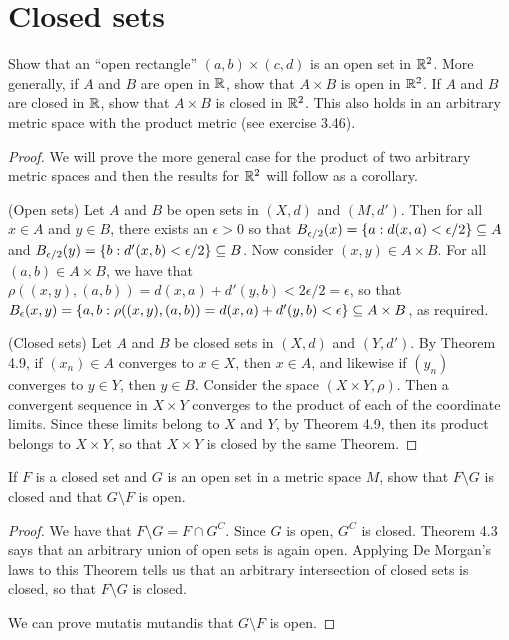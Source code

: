 \section{Closed sets}


\begin{exercise}{1}
Show that an ``open rectangle'' $(a,b)\times (c,d)$ is an open set in $\mathbb{R}^2$. More generally, if $A$ and $B$ are open in $\mathbb{R}$, show that $A\times B$ is open in $\mathbb{R}^2$. 
If $A$ and $B$ are closed in $\mathbb{R}$, show that $A\times B$ is closed in $\mathbb{R}^2$. 
This also holds in an arbitrary metric space with the product metric (see exercise 3.46).
\end{exercise}
\begin{proof}
We will prove the more general case for the product of two arbitrary metric spaces and then the results for $\mathbb{R}^2$ will follow as a corollary.

(Open sets) Let $A$ and $B$ be open sets in $(X,d)$ and $(M,d')$. 
Then for all $x\in A$ and $y\in B$, there exists an $\epsilon>0$ so that $B_{\epsilon/2}(x)=\{a:d(x,a)<\epsilon/2\}\subseteq A$ and $B_{\epsilon/2}(y)=\{b:d'(x,b)<\epsilon/2\}\subseteq B$. 
Now consider $(x,y)\in A\times B$. 
For all $(a,b)\in A\times B$, we have that $\rho((x,y),(a,b))=d(x,a)+d'(y,b)<2\epsilon/2=\epsilon$, so that $B_\epsilon(x,y)=\{a,b:\rho((x,y),(a,b))=d(x,a)+d'(y,b)<\epsilon\}\subseteq A\times B$, as required.

(Closed sets) Let $A$ and $B$ be closed sets in $(X,d)$ and $(Y,d')$. 
By Theorem 4.9, if $(x_n)\in A$ converges to $x\in X$, then $x\in A$, and likewise if $(y_n)$ converges to $y\in Y$, then $y\in B$. 
Consider the space $(X\times Y, \rho)$. 
Then a convergent sequence in $X\times Y$ converges to the product of each of the coordinate limits. 
Since these limits belong to $X$ and $Y$, by Theorem 4.9, then its product belongs to $X\times Y$, so that $X\times Y$ is closed by the same Theorem.
\end{proof} 

\begin{exercise}{2}
If $F$ is a closed set and $G$ is an open set in a metric space $M$, show that $F\setminus G$ is closed and that $G\setminus F$ is open.
\end{exercise}
\begin{proof}
We have that $F\setminus G= F\cap G^C$. Since $G$ is open, $G^C$ is closed. 
Theorem 4.3 says that an arbitrary union of open sets is again open. 
Applying De Morgan's laws to this Theorem tells us that an arbitrary intersection of closed sets is closed, so that $F\setminus G$ is closed.

We can prove mutatis mutandis that $G\setminus F$ is open.
\end{proof} 

